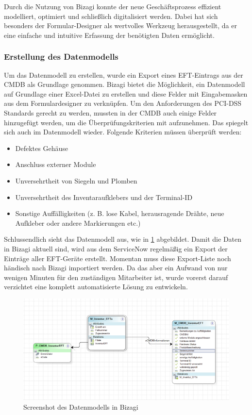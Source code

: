 \documentclass[12pt, a4paper]{article}
\begin{document}
Durch die Nutzung von Bizagi konnte der neue Geschäftsprozess effizient modelliert, optimiert und schließlich digitalisiert werden. Dabei hat sich besonders der 
Formular-Designer als wertvolles Werkzeug herausgestellt, da er eine einfache und intuitive Erfassung der benötigten Daten ermöglicht.

\subsubsection{Erstellung des Datenmodells}
Um das Datenmodell zu erstellen, wurde ein Export eines EFT-Eintrags aus der CMDB als Grundlage genommen. Bizagi bietet die Möglichkeit, ein Datenmodell auf Grundlage einer 
Excel-Datei zu erstellen und diese Felder mit Eingabemasken aus dem Formulardesigner zu verknüpfen. Um den Anforderungen des PCI-DSS Standards gerecht zu werden, mussten in der
CMDB auch einige Felder hinzugefügt werden, um die Überprüfungskriterien mit aufzunehmen. Das spiegelt sich auch im Datenmodell wieder.
Folgende Kriterien müssen überprüft  werden:

\begin{itemize}
    \item Defektes Gehäuse
    \item Anschluss externer Module
    \item Unversehrtheit von Siegeln und Plomben
    \item Unversehrtheit des Inventaraufklebers und der Terminal-ID
    \item Sonstige Auffälligkeiten (z. B. lose Kabel, herausragende Drähte, neue Aufkleber oder andere Markierungen etc.)
\end{itemize}

Schlussendlich sieht das Datenmodell aus, wie in \ref{fig:data-model} abgebildet.
Damit die Daten in Bizagi aktuell sind, wird aus dem ServiceNow regelmäßig ein Export der Einträge aller EFT-Geräte erstellt. Momentan muss diese Export-Liste noch händisch
nach Bizagi importiert werden. Da das aber ein Aufwand von nur wenigen Minuten für den zuständigen Mitarbeiter ist, wurde vorerst darauf verzichtet eine komplett automatisierte 
Lösung zu entwickeln.

\begin{figure}[h]
    \centering
    \includegraphics[width=\textwidth]{images/data-model.png}
    \caption{Screenshot des Datenmodells in Bizagi}
    \label{fig:data-model}
\end{figure}
\newpage
\end{document}
